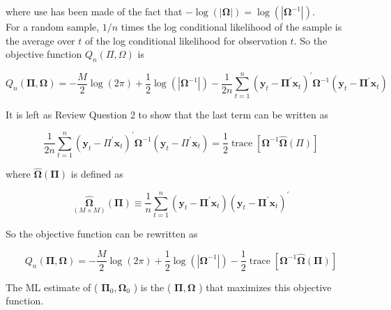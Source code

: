 \documentclass[10pt]{article}
\begin{document}
where use has been made of the fact that $-\log (|\boldsymbol{\Omega}|)=\log \left(\left|\boldsymbol{\Omega}^{-1}\right|\right)$.\\
For a random sample, $1 / n$ times the log conditional likelihood of the sample is the average over $t$ of the log conditional likelihood for observation $t$. So the objective function $Q_{n}(\Pi, \Omega)$ is


\begin{equation*}
Q_{n}(\boldsymbol{\Pi}, \boldsymbol{\Omega})=-\frac{M}{2} \log (2 \pi)+\frac{1}{2} \log \left(\left|\boldsymbol{\Omega}^{-1}\right|\right)-\frac{1}{2 n} \sum_{t=1}^{n}\left(\mathbf{y}_{t}-\boldsymbol{\Pi}^{\prime} \mathbf{x}_{t}\right)^{\prime} \boldsymbol{\Omega}^{-1}\left(\mathbf{y}_{t}-\boldsymbol{\Pi}^{\prime} \mathbf{x}_{t}\right) \tag{8.4.8}
\end{equation*}


It is left as Review Question 2 to show that the last term can be written as


\begin{equation*}
\frac{1}{2 n} \sum_{t=1}^{n}\left(\mathbf{y}_{t}-\Pi^{\prime} \mathbf{x}_{t}\right)^{\prime} \mathbf{\Omega}^{-1}\left(\mathbf{y}_{t}-\Pi^{\prime} \mathbf{x}_{t}\right)=\frac{1}{2} \operatorname{trace}\left[\mathbf{\Omega}^{-1} \widehat{\mathbf{\Omega}}(\Pi)\right] \tag{8.4.9}
\end{equation*}


where $\widehat{\boldsymbol{\Omega}}(\boldsymbol{\Pi})$ is defined as


\begin{equation*}
\underset{(M \times M)}{\widehat{\boldsymbol{\Omega}}}(\boldsymbol{\Pi}) \equiv \frac{1}{n} \sum_{t=1}^{n}\left(\mathbf{y}_{t}-\boldsymbol{\Pi}^{\prime} \mathbf{x}_{t}\right)\left(\mathbf{y}_{t}-\boldsymbol{\Pi}^{\prime} \mathbf{x}_{t}\right)^{\prime} \tag{8.4.10}
\end{equation*}


So the objective function can be rewritten as


\begin{equation*}
Q_{n}(\boldsymbol{\Pi}, \boldsymbol{\Omega})=-\frac{M}{2} \log (2 \pi)+\frac{1}{2} \log \left(\left|\boldsymbol{\Omega}^{-1}\right|\right)-\frac{1}{2} \operatorname{trace}\left[\boldsymbol{\Omega}^{-1} \widehat{\boldsymbol{\Omega}}(\boldsymbol{\Pi})\right] \tag{8.4.11}
\end{equation*}


The ML estimate of ( $\boldsymbol{\Pi}_{0}, \boldsymbol{\Omega}_{0}$ ) is the ( $\boldsymbol{\Pi}, \boldsymbol{\Omega}$ ) that maximizes this objective function.
\end{document}
